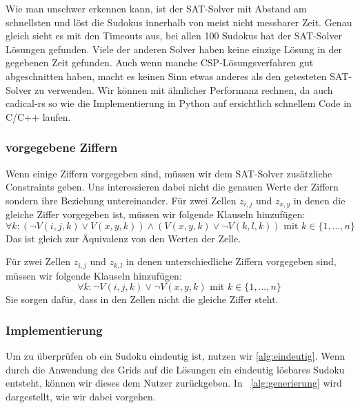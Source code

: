 Wie man unschwer erkennen kann, ist der SAT-Solver mit Abstand am schnellsten und löst die Sudokus innerhalb von meist nicht messbarer Zeit.
Genau gleich sieht es mit den Timeouts aus, bei allen 100 Sudokus hat der SAT-Solver Lösungen gefunden.
Viele der anderen Solver haben keine einzige Lösung in der gegebenen Zeit gefunden.
Auch wenn manche CSP-Lösungsverfahren gut abgeschnitten haben, macht es keinen Sinn etwas anderes als den getesteten SAT-Solver zu verwenden.
Wir können mit ähnlicher Performanz rechnen, da auch cadical-rs so wie die Implementierung in Python auf ersichtlich schnellem Code in C/C++ laufen.

\subsubsection{vorgegebene Ziffern}
Wenn einige Ziffern vorgegeben sind, müssen wir dem SAT-Solver zusätzliche Constraints geben.
Uns interessieren dabei nicht die genauen Werte der Ziffern sondern ihre Beziehung untereinander.
Für zwei Zellen $z_{i, j}$ und $z_{x, y}$ in denen die gleiche Ziffer vorgegeben ist, müssen wir folgende Klauseln hinzufügen:
\begin{equation}
    \forall k: (\neg V(i, j, k) \lor V(x,y, k)) \land  (V(x, y, k) \lor \neg V(k, l, k)) \text{ mit }k \in \{1, ..., n\}
\end{equation}
Das ist gleich zur Äquivalenz von den Werten der Zelle.

Für zwei Zellen $z_{i, j}$ und $z_{k, l}$ in denen unterschiedliche Ziffern vorgegeben sind, müssen wir folgende Klauseln hinzufügen:
\begin{equation}
    \forall k: \neg V(i, j, k) \lor \neg V(x, y, k) \text{ mit }k \in \{1, ..., n\}
\end{equation}
Sie sorgen dafür, dass in den Zellen nicht die gleiche Ziffer steht.

\subsubsection{Implementierung}
Um zu überprüfen ob ein Sudoku eindeutig ist, nutzen wir \cref{alg:eindeutig}.
Wenn durch die Anwendung des Grids auf die Lösungen ein eindeutig lösbares Sudoku entsteht, können wir dieses dem Nutzer zurückgeben.
In ~\cref{alg:generierung} wird dargestellt, wie wir dabei vorgehen.

